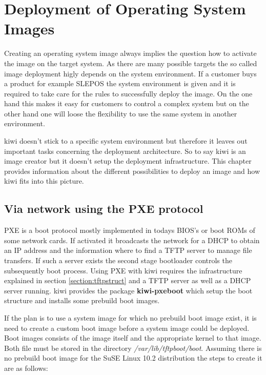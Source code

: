 \chapter{Deployment of Operating System Images}
\label{chapter:dpopsysimg}
\minitoc

Creating an operating system image always implies the question
how to activate the image on the target system. As there are many
possible targets the so called image deployment higly depends on
the system environment. If a customer buys a product for example SLEPOS
the system environment is given and it is required to take care for the
rules to successfully deploy the image. On the one hand this
makes it easy for customers to control a complex system but on
the other hand one will loose the flexibility to use the same
system in another environment.

kiwi doesn't stick to a specific system environment but therefore
it leaves out important tasks concerning the deployment architecture.
So to say kiwi is an image creator but it doesn't setup the
deployment infrastructure. This chapter provides information about
the different possibilities to deploy an image and how kiwi fits
into this picture.

\section{Via network using the PXE protocol}
PXE is a boot protocol mostly implemented in todays BIOS's or
boot ROMs of some network cards. If activated it broadcasts the
network for a DHCP to obtain an IP address and the information
where to find a TFTP server to manage file transfers. If such a server
exists the second stage bootloader controls the subsequently
boot process. Using PXE with kiwi requires the infrastructure
explained in section \ref{section:tftpstruct} and a TFTP server
as well as a DHCP server running. kiwi provides the package
\textbf{kiwi-pxeboot} which setup the boot structure and installs
some prebuild boot images.

If the plan is to use a system image for which no prebuild boot image
exist, it is need to create a custom boot image before a system image
could be deployed. Boot images consists of the image itself and
the appropriate kernel to that image. Both file must be stored in
the directory \textit{/var/lib/tftpboot/boot}. Assuming there is no
prebuild boot image for the SuSE Linux 10.2 distribution the steps
to create it are as follows:

